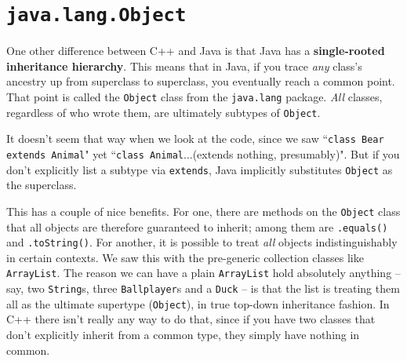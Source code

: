 \section{\texttt{java.lang.Object}}

One other difference between C++ and Java is that Java has a
\textbf{single-rooted inheritance hierarchy}. This means that in Java, if you
trace \textit{any} class's ancestry up from superclass to superclass, you
eventually reach a common point. That point is called the \texttt{Object}
class from the \texttt{java.lang} package. \textit{All} classes, regardless of
who wrote them, are ultimately subtypes of \texttt{Object}.

It doesn't seem that way when we look at the code, since we saw
``\texttt{class Bear extends Animal}" yet ``\texttt{class Animal}...(extends
nothing, presumably)". But if you don't explicitly list a subtype via
\texttt{extends}, Java implicitly substitutes \texttt{Object} as the
superclass.

This has a couple of nice benefits. For one, there are methods on the
\texttt{Object} class that all objects are therefore guaranteed to inherit;
among them are \texttt{.equals()} and \texttt{.toString()}. For another, it is
possible to treat \textit{all} objects indistinguishably in certain contexts.
We saw this with the pre-generic collection classes like \texttt{ArrayList}.
The reason we can have a plain \texttt{ArrayList} hold absolutely anything --
say, two \texttt{String}s, three \texttt{Ballplayer}s and a \texttt{Duck} --
is that the list is treating them all as the ultimate supertype
(\texttt{Object}), in true top-down inheritance fashion. In C++ there isn't
really any way to do that, since if you have two classes that don't explicitly
inherit from a common type, they simply have nothing in common.

